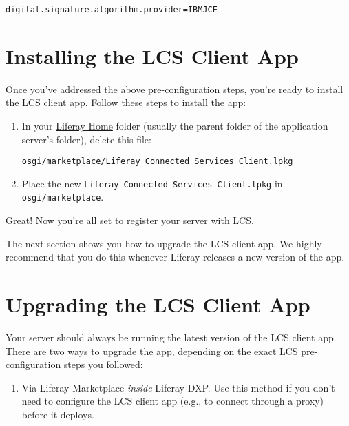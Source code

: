 \begin{verbatim}
digital.signature.algorithm.provider=IBMJCE
\end{verbatim}

\section{Installing the LCS Client
App}\label{installing-the-lcs-client-app}

Once you've addressed the above pre-configuration steps, you're ready to
install the LCS client app. Follow these steps to install the app:

\begin{enumerate}
\def\labelenumi{\arabic{enumi}.}
\item
  In your
  \href{/docs/7-2/deploy/-/knowledge_base/d/liferay-home}{Liferay Home}
  folder (usually the parent folder of the application server's folder),
  delete this file:

\begin{verbatim}
osgi/marketplace/Liferay Connected Services Client.lpkg
\end{verbatim}
\item
  Place the new \texttt{Liferay\ Connected\ Services\ Client.lpkg} in
  \texttt{osgi/marketplace}.
\end{enumerate}

Great! Now you're all set to
\href{/docs/7-2/deploy/-/knowledge_base/d/activating-your-liferay-dxp-server-with-lcs}{register
your server with LCS}.

The next section shows you how to upgrade the LCS client app. We highly
recommend that you do this whenever Liferay releases a new version of
the app.

\section{Upgrading the LCS Client
App}\label{upgrading-the-lcs-client-app}

Your server should always be running the latest version of the LCS
client app. There are two ways to upgrade the app, depending on the
exact LCS pre-configuration steps you followed:

\begin{enumerate}
\def\labelenumi{\arabic{enumi}.}
\tightlist
\item
  Via Liferay Marketplace \emph{inside} Liferay DXP. Use this method if
  you don't need to configure the LCS client app (e.g., to connect
  through a proxy) before it deploys.
\end{enumerate}

